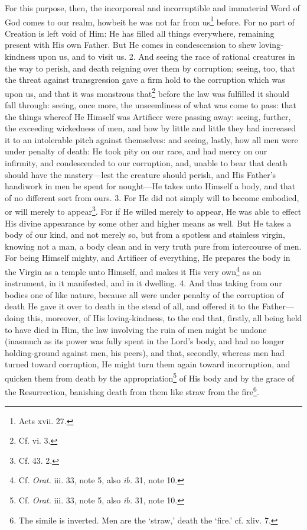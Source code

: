 For this purpose, then, the incorporeal and incorruptible and immaterial Word of God comes to our realm, howbeit he was not far from us\footnote{Acts xvii. 27.} before. For no part of Creation is left void of Him: He has filled all things everywhere, remaining present with His own Father. But He comes in condescension to shew loving-kindness upon us, and to visit us. 2. And seeing the race of rational creatures in the way to perish, and death reigning over them by corruption; seeing, too, that the threat against transgression gave a firm hold to the corruption which was upon us, and that it was monstrous that\footnote{Cf. vi. 3.} before the law was fulfilled it should fall through: seeing, once more, the unseemliness of what was come to pass: that the things whereof He Himself was Artificer were passing away: seeing, further, the exceeding wickedness of men, and how by little and little they had increased it to an intolerable pitch against themselves: and seeing, lastly, how all men were under penalty of death: He took pity on our race, and had mercy on our infirmity, and condescended to our corruption, and, unable to bear that death should have the mastery—lest the creature should perish, and His Father’s handiwork in men be spent for nought—He takes unto Himself a body, and that of no different sort from ours. 3. For He did not simply will to become embodied, or will merely to appear\footnote{Cf. 43. 2.}. For if He willed merely to appear, He was able to effect His divine appearance by some other and higher means as well. But He takes a body of our kind, and not merely so, but from a spotless and stainless virgin, knowing not a man, a body clean and in very truth pure from intercourse of men. For being Himself mighty, and Artificer of everything, He prepares the body in the Virgin as a temple unto Himself, and makes it His very own\footnote{Cf. \emph{Orat.} iii. 33, note 5, also \emph{ib.} 31, note 10.} as an instrument, in it manifested, and in it dwelling. 4. And thus taking from our bodies one of like nature, because all were under penalty of the corruption of death He gave it over to death in the stead of all, and offered it to the Father—doing this, moreover, of His loving-kindness, to the end that, firstly, all being held to have died in Him, the law involving the ruin of men might be undone (inasmuch as its power was fully spent in the Lord’s body, and had no longer holding-ground against men, his peers), and that, secondly, whereas men had turned toward corruption, He might turn them again toward incorruption, and quicken them from death by the appropriation\footnote{Cf. \emph{Orat.} iii. 33, note 5, also \emph{ib.} 31, note 10.} of His body and by the grace of the Resurrection, banishing death from them like straw from the fire\footnote{The simile is inverted. Men are the ‘straw,’ death the ‘fire.’ cf. xliv. 7.}.

